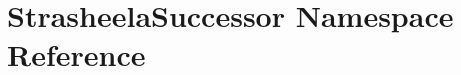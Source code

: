 \hypertarget{namespace_strasheela_successor}{\section{Strasheela\-Successor Namespace Reference}
\label{namespace_strasheela_successor}
}
